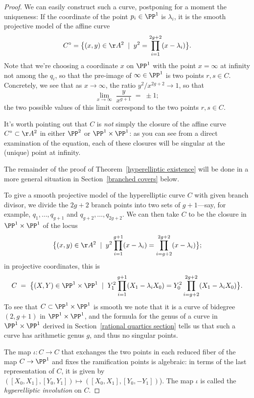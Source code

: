 \begin{proof} 
We can easily construct such a curve, postponing for a moment the uniqueness:
If the coordinate of the point $p_i \in \PP^1$ is $\lambda_i$, it is the smooth projective model of the affine curve 
  $$
C^\circ = \big\{ (x,y) \in \AA^2 \; \mid \; y^2 = \prod_{i=1}^{2g+2} (x - \lambda_i) \big\}.
$$ 
Note that we're choosing a coordinate $x$ on $\PP^1$ with the point $x = \infty$ at infinity not among the $q_i$, so that the pre-image of $\infty \in \PP^1$ is two points $r, s \in C$. Concretely, we see that as $x \to \infty$, the ratio $y^2/x^{2g+2} \to 1$, so that 
$$
\lim_{x \to \infty} \; \frac{y}{x^{g+1}} \; = \; \pm 1;
$$
  the two possible values of this limit correspond to the two points $r,s \in C$.
  
  It's worth pointing out that $C$ is \emph{not} simply the closure of the affine curve $C^\circ \subset \AA^2$ in either $\PP^2$ or $\PP^1 \times \PP^1$: as you can see from a direct examination of the equation, each of these closures will be singular at the (unique) point at infinity.
  
   The remainder of the proof of Theorem~\ref{hyperelliptic existence} will be done in a more general situation in Section~\ref{branched covers} below.
  
To give a smooth projective model of the hyperelliptic curve $C$ with given branch divisor, we divide the $2g+2$ branch points  into two sets of $g+1$---say, for example, $q_1,\dots,q_{g+1}$ and $q_{g+2}, \dots, q_{2g+2}$. We can then take $C$ to be the closure in $\PP^1 \times \PP^1$ of the  locus
  $$
  \big\{ (x,y) \in \AA^2 \; \mid \; y^2\prod_{i=1}^{g+1} (x - \lambda_i) = \prod_{i=g+2}^{2g+2} (x - \lambda_i) \big\};
  $$
  in projective coordinates, this is
   $$
  C \; = \; \big\{ (X,Y) \in \PP^1 \times \PP^1 \; \mid \; Y_1^2\prod_{i=1}^{g+1} (X_1 - \lambda_iX_0) = Y_0^2\prod_{i=g+2}^{2g+2} (X_1 - \lambda_iX_0) \big\}.
  $$
To see that $C \subset \PP^1 \times \PP^1$ is smooth we note that it is a curve of bidegree $(2,g+1)$ in $\PP^1 \times \PP^1$, and the formula for the genus of a curve in $\PP^1 \times \PP^1$ derived in Section~\ref{rational quartics section} tells us that such a curve has arithmetic genus $g$, and thus no singular points.
  
 The map $\iota : C \to C$ that exchanges the two points in each reduced fiber of the map $C \to \PP^1$ and fixes the ramification points is algebraic: in terms of the last representation of $C$, it is given by $([X_0,X_1], [Y_0,Y_1]) \mapsto  ([X_0,X_1], [Y_0,-Y_1]) $). The map $\iota$ is called the \emph{hyperelliptic involution} on $C$.


\end{proof}
